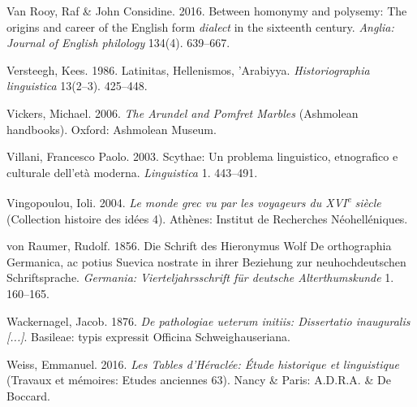 \begin{styleStandard}
Van Rooy, Raf \& John Considine. 2016. Between homonymy and polysemy: The origins and career of the English form \textit{dialect} in the sixteenth century. \textit{Anglia: Journal of English philology} 134(4). 639–667.
\end{styleStandard}

\begin{styleStandard}
Versteegh, Kees. 1986. Latinitas, Hellenismos, ’Arabiyya. \textit{Historiographia linguistica} 13(2–3). 425–448.
\end{styleStandard}

\begin{styleStandard}
Vickers, Michael. 2006. \textit{The Arundel and Pomfret Marbles} (Ashmolean handbooks). Oxford: Ashmolean Museum.
\end{styleStandard}

\begin{styleStandard}
Villani, Francesco Paolo. 2003. Scythae: Un problema linguistico, etnografico e culturale dell’età moderna. \textit{Linguistica} 1. 443–491.
\end{styleStandard}

\begin{styleStandard}
Vingopoulou, Ioli. 2004. \textit{Le monde grec vu par les voyageurs du XVI}\textit{\textsuperscript{e}}\textit{ siècle} (Collection histoire des idées 4). Athènes: Institut de Recherches Néohelléniques.
\end{styleStandard}

\begin{styleStandard}
von Raumer, Rudolf. 1856. Die Schrift des Hieronymus Wolf De orthographia Germanica, ac potius Suevica nostrate in ihrer Beziehung zur neuhochdeutschen Schriftsprache. \textit{Germania: Vierteljahrsschrift für deutsche Alterthumskunde} 1. 160–165.
\end{styleStandard}

\begin{styleStandard}
Wackernagel, Jacob. 1876. \textit{De pathologiae ueterum initiis: Dissertatio inauguralis [...]}. Basileae: typis expressit Officina Schweighauseriana.
\end{styleStandard}

\begin{styleStandard}
Weiss, Emmanuel. 2016. \textit{Les Tables d’Héraclée: Étude historique et linguistique} (Travaux et mémoires: Etudes anciennes 63). Nancy \& Paris: A.D.R.A. \& De Boccard.
\end{styleStandard}

